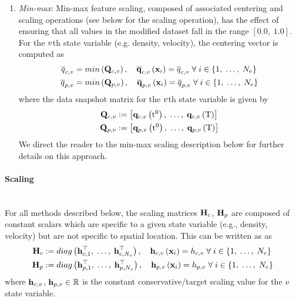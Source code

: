 \begin{enumerate}
	\item \textit{Min-max}: Min-max feature scaling, composed of associated centering and scaling operations (see below for the scaling operation), has the effect of ensuring that all values in the modified dataset fall in the range $[0.0, \; 1.0]$. For the $v$th state variable (e.g. density, velocity), the centering vector is computed as
	\begin{align}
		\consValCentVar &= min\left(\consDataMatVar\right), \quad \consVecCentVar\left(\spatialVec_{\dummyIdx}\right) = \consValCentVar \; \forall \; \dummyIdx \in \{1, \; \hdots, \; \numCells\} \\
		\primValCentVar &= min\left(\primDataMatVar\right), \quad \primVecCentVar\left(\spatialVec_{\dummyIdx}\right) = \primValCentVar \; \forall \; \dummyIdx \in \{1, \; \hdots, \; \numCells\}
	\end{align}
	where the data snapshot matrix for the $v$th state variable is given by
	\begin{align}
		\consDataMatVar &\defEq \left[ \consVecVar\left(\initTime\right), \; \hdots, \; \consVecVar\left(\finalTime\right) \right] \label{eq:consDataMat}\\
		\primDataMatVar &\defEq \left[ \primVecVar\left(\initTime\right), \; \hdots, \; \primVecVar\left(\finalTime\right) \right] \label{eq:primDataMat}
	\end{align}
	We direct the reader to the min-max scaling description below for further details on this approach.
\end{enumerate}

\paragraph*{Scaling}\mbox{}\\
%
For all methods described below, the scaling matrices $\consScale$, $\primScale$ are composed of constant scalars which are specific to a given state variable (e.g., density, velocity) but are not specific to spatial location. This can be written as as
%
\begin{align}
	\consScale &\defEq diag\left(\consScaleVecVar{1}^\top, \; \hdots, \; \consScaleVecVar{\numVars}^\top \right), \quad \consScaleVecVar{\varIdx}\left(\spatialVec_{\dummyIdx}\right) = \consScaleVar{\varIdx} \; \forall \; \dummyIdx \in \{1, \; \hdots, \; \numCells\} \\
	\primScale &\defEq diag\left(\primScaleVecVar{1}^\top, \; \hdots, \; \primScaleVecVar{\numVars}^\top \right), \quad \primScaleVecVar{\varIdx}\left(\spatialVec_{\dummyIdx}\right) = \primScaleVar{\varIdx} \; \forall \; \dummyIdx \in \{1, \; \hdots, \; \numCells\}
\end{align}
%
where $\mathbf{h}_{c,v}$, $\mathbf{h}_{p,v} \in \mathbb{R}$ is the constant conservative/target scaling value for the $v$ state variable.


